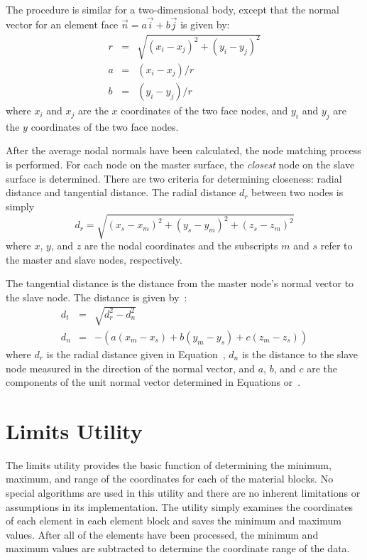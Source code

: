The procedure is similar for a two-dimensional body, except that the
normal vector for an element face $\vec{n} = a\vec{i} + b\vec{j}$ is given by:
\begin{eqnarray}
      r &=& \sqrt{(x_i - x_j)^2 + (y_i - y_j)^2} \nonumber \\
      a &=& (x_i - x_j) / r                      \label{2dnorm}\\
      b &=& (y_i - y_j) / r                      \nonumber
\end{eqnarray}
where $x_i$ and $x_j$ are the $x$ coordinates of the two face nodes, and
$y_i$ and $y_j$ are the $y$ coordinates of the two face nodes.

After the average nodal normals have been calculated, the node matching
process is performed.  For each node on the master surface, the {\em
closest} node on the slave surface is determined.  There are two
criteria for determining closeness: radial distance and tangential
distance.  The radial distance $d_r$ between two nodes is simply
\begin{equation}
d_r = \sqrt{(x_s - x_m)^2 + (y_s - y_m)^2 + (z_s - z_m)^2}\label{distr}
\end{equation}
where $x$, $y$, and $z$ are the nodal coordinates and the subscripts $m$
and $s$ refer to the master and slave nodes, respectively.

The tangential distance is the distance from the master node's normal
vector to the slave node.  The distance is given by~\cite{Rogers:pefcg}:
\begin{eqnarray}
d_t &=& \sqrt{d_r^2 - d_n^2}\label{distt}  \\
d_n &=& -\left(a(x_m - x_s) + b(y_m - y_s)+c(z_m-z_s)\right)\label{distn}
\end{eqnarray}
where $d_r$ is the radial distance given in Equation~, $d_n$
is the distance to the slave node measured in the direction of the
normal vector, and $a$, $b$, and $c$ are the components of the unit
normal vector determined in Equations  or~.

\section{Limits Utility}

The limits utility provides the basic function of determining the
minimum, maximum, and range of the coordinates for each of the material
blocks.  No special algorithms are used in this utility and there are no
inherent limitations or assumptions in its implementation. The utility
simply examines the coordinates of each element in each element block
and saves the minimum and maximum values.  After all of the elements
have been processed, the minimum and maximum values are subtracted to
determine the coordinate range of the data.
